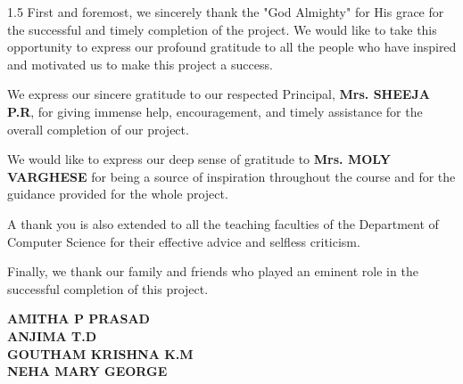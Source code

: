 \documentclass[12pt, a4paper, oneside]{report}
\begin{document}
\begin{spacing}{1.5}
First and foremost, we sincerely thank the "God Almighty" for His grace for the successful and timely completion of the project. We would like to take this opportunity to express our profound gratitude to all the people who have inspired and motivated us to make this project a success.

We express our sincere gratitude to our respected Principal, \textbf{Mrs. SHEEJA P.R}, for giving immense help, encouragement, and timely assistance for the overall completion of our project.

We would like to express our deep sense of gratitude to \textbf{Mrs. MOLY VARGHESE} for being a source of inspiration throughout the course and for the guidance provided for the whole project.

A thank you is also extended to all the teaching faculties of the Department of Computer Science for their effective advice and selfless criticism. 

Finally, we thank our family and friends who played an eminent role in the successful completion of this project.
\end{spacing}
\vspace{1cm}
\begin{flushright}
    \textbf{AMITHA P PRASAD} \\
    \textbf{ANJIMA T.D} \\
    \textbf{GOUTHAM KRISHNA K.M} \\
    \textbf{NEHA MARY GEORGE}
\end{flushright}
\newpage
\end{document}
